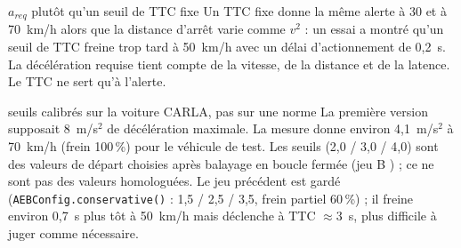 \documentclass[11pt,a4paper]{article}
\providecommand{\og}{\guillemotleft\nobreakspace}
\providecommand{\fg}{\nobreakspace\guillemotright}
\newcommand{\code}[1]{\texttt{#1}}
\begin{document}
\begin{choix}{$a_{req}$ plut\^ot qu'un seuil de TTC fixe}
Un TTC fixe donne la m\^eme alerte \`a 30 et \`a 70~km/h alors que la distance d'arr\^et varie comme $v^2$ : un essai a montr\'e qu'un seuil de TTC freine trop tard
\`a 50~km/h avec un d\'elai d'actionnement de 0,2~s. La d\'ec\'el\'eration requise tient compte de la vitesse, de la distance et de la latence. Le TTC ne sert qu'\`a l'alerte.
\end{choix}
\begin{choix}{seuils calibr\'es sur la voiture CARLA, pas sur une norme}
La premi\`ere version supposait 8~m/s$^2$ de d\'ec\'el\'eration maximale. La mesure donne environ 4,1~m/s$^2$ \`a 70~km/h (frein 100\,\%) pour le v\'ehicule de test.
Les seuils (2,0 / 3,0 / 4,0) sont des valeurs de d\'epart choisies apr\`es balayage en boucle ferm\'ee (jeu \og B \fg) ; ce ne sont pas des valeurs homologu\'ees.
Le jeu pr\'ec\'edent est gard\'e (\code{AEBConfig.conservative()} : 1,5 / 2,5 / 3,5, frein partiel 60\,\%) ; il freine environ 0,7~s plus t\^ot \`a 50~km/h mais
d\'eclenche \`a TTC $\approx3$~s, plus difficile \`a juger comme n\'ecessaire.
\end{choix}
\end{document}
